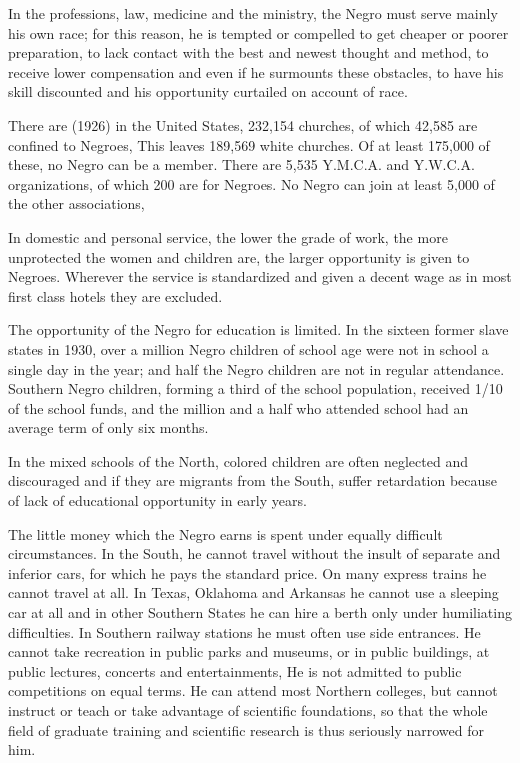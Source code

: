 \documentclass[letterpaper,10pt,english]{jupyterBook}
\begin{document}
\sphinxAtStartPar
In the professions, law, medicine and the ministry, the Negro must serve mainly his own race; for this reason, he is tempted or compelled to get cheaper or poorer preparation, to lack contact with the best and newest thought and method, to receive lower compensation and even if he surmounts these obstacles, to have his skill discounted and his opportunity curtailed on account of race.

\sphinxAtStartPar
There are (1926) in the United States, 232,154 churches, of which 42,585 are confined to Negroes, This leaves 189,569 white churches. Of at least 175,000 of these, no Negro can be a member. There are 5,535 Y.M.C.A. and Y.W.C.A. organizations, of which 200 are for Negroes. No Negro can join at least 5,000 of the other associations,

\sphinxAtStartPar
In domestic and personal service, the lower the grade of work, the more unprotected the women and children are, the larger opportunity is given to Negroes. Wherever the service is standardized and given a decent wage as in most first class hotels they are excluded.

\sphinxAtStartPar
The opportunity of the Negro for education is limited. In the sixteen former slave states in 1930, over a million Negro children of school age were not in school a single day in the year; and half the Negro children are not in regular attendance. Southern Negro children, forming a third of the school population, received 1/10 of the school funds, and the million and a half who attended school had an average term of only six months.

\sphinxAtStartPar
In the mixed schools of the North, colored children are often neglected and discouraged and if they are migrants from the South, suffer retardation because of lack of educational opportunity in early years.

\sphinxAtStartPar
The little money which the Negro earns is spent under equally difficult circumstances. In the South, he cannot travel without the insult of separate and inferior cars, for which he pays the standard price. On many express trains he cannot travel at all. In Texas, Oklahoma and Arkansas he cannot use a sleeping car at all and in other Southern States he can hire a berth only under humiliating difficulties. In Southern railway stations he must often use side entrances. He cannot take recreation in public parks and museums, or in public buildings, at public lectures, concerts and entertainments, He is not admitted to public competitions on equal terms. He can attend most Northern colleges, but cannot instruct or teach or take advantage of scientific foundations, so that the whole field of graduate training and scientific research is thus seriously narrowed for him.
\end{document}
